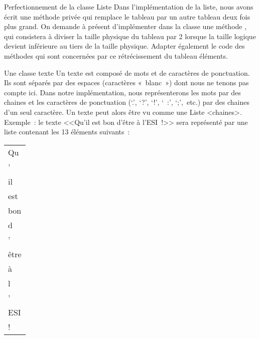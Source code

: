 \begin{Exercice}{Perfectionnement de la classe Liste}
	Dans l’implémentation de la liste, nous avons écrit 
	une méthode privée  qui remplace le tableau 
	 par un autre tableau deux fois plus grand. 
	On demande à présent d’implémenter dans la classe 
	une méthode , qui consistera à diviser la 
	taille physique du tableau par 2 lorsque la taille 
	logique devient inférieure au tiers de la taille physique.
	Adapter également le code des méthodes qui sont concernées 
	par ce rétrécissement du tableau éléments.

\end{Exercice}

\begin{Exercice}{Une classe texte}
	Un texte est composé de mots et de caractères de ponctuation. 
	Ils sont séparés par des espaces (caractères «~blanc~») dont 
	nous ne tenons pas compte ici. Dans notre implémentation, nous 
	représenterons les mots par des chaines et les caractères de ponctuation 
	(‘.’, ‘?’, ‘!’, ‘~:’, ‘;’,~etc.) par des chaines d’un seul caractère. 
	Un texte peut alors être vu comme une Liste <chaines>. 
	Exemple~: le texte <<Qu’il est bon d’être à l’ESI~!>>
	sera représenté par une liste contenant les 13 éléments suivants~:
	\begin{center}
	\tablehead{}
	\begin{supertabular}{|m{8cm}|}
		\hline
		Qu \\
		’	\\
		il \\
		est \\
		bon \\
		d \\
		’ \\
		être \\
		à \\
		l \\
		’ \\
		ESI \\
		! \\\hline
	\end{supertabular}
	\end{center}
	

\end{Exercice}
